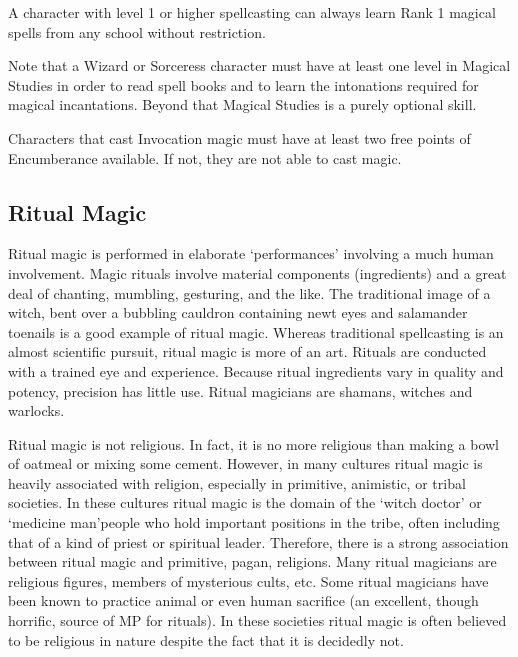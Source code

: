 \documentclass[twoside]{book}
\begin{document}
    {  
     A character with level 1 or higher spellcasting can
               always learn Rank 1 magical spells from any school without
               restriction. 
    }
  
    {  
     Note that a Wizard or Sorceress character must have
               at least one level in Magical Studies in order to read
               spell books and to learn the intonations required for
               magical incantations. Beyond that Magical Studies is a
               purely optional skill. 
    }
  
    {  
     Characters that cast Invocation magic must have at
               least two free points of Encumberance available. If not,
               they are not able to cast magic. 
    }
  
    

\subsection{Ritual Magic}
    
    {  
     Ritual magic is performed in elaborate
               `performances' involving a much human
               involvement. Magic rituals involve material components
               (ingredients) and a great deal of chanting, mumbling,
               gesturing, and the like. The traditional image of a witch,
               bent over a bubbling cauldron containing newt eyes and
               salamander toenails is a good example of ritual magic.
               Whereas traditional spellcasting is an almost scientific
               pursuit, ritual magic is more of an art. Rituals are
               conducted with a trained eye and experience. Because
               ritual ingredients vary in quality and potency, precision
               has little use. Ritual magicians are shamans, witches and
               warlocks. 
    }
  
    {  
     Ritual magic is not religious. In fact, it is no
               more religious than making a bowl of oatmeal or mixing
               some cement. However, in many cultures ritual magic is
               heavily associated with religion, especially in primitive,
               animistic, or tribal societies. In these cultures ritual
               magic is the domain of the `witch doctor' or
               `medicine man'people who hold important
               positions in the tribe, often including that of a kind of
               priest or spiritual leader. Therefore, there is a strong
               association between ritual magic and primitive, pagan,
               religions. Many ritual magicians are religious figures,
               members of mysterious cults, etc. Some ritual magicians
               have been known to practice animal or even human sacrifice
               (an excellent, though horrific, source of MP for rituals).
               In these societies ritual magic is often believed to be
               religious in nature despite the fact that it is decidedly
               not. 
    }
  
\end{document}
